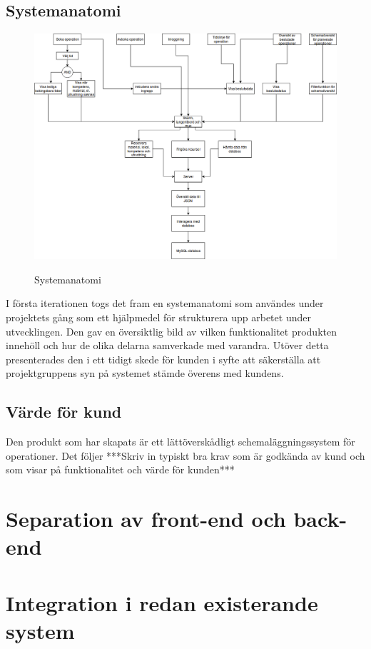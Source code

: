 \subsection{Systemanatomi}
\begin{figure}
\includegraphics[width=\textwidth,height=.4\textheight]{Figures/Systemanatomi.png}\\
\caption{Systemanatomi}
\label{fig:Systemanatomi}
\end{figure}

I första iterationen togs det fram en systemanatomi som användes under projektets gång som ett hjälpmedel för strukturera upp arbetet under utvecklingen. Den gav en översiktlig bild av vilken funktionalitet produkten innehöll och hur de olika delarna samverkade med varandra. Utöver detta presenterades den i ett tidigt skede för kunden i syfte att säkerställa att projektgruppens syn på systemet stämde överens med kundens. 

\subsection{Värde för kund}
Den produkt som har skapats är ett lättöverskådligt schemaläggningssystem för operationer. Det följer ***Skriv in typiskt bra krav som är godkända av kund och som visar på funktionalitet och värde för kunden***

\section{Separation av front-end och back-end}

\section{Integration i redan existerande system}

